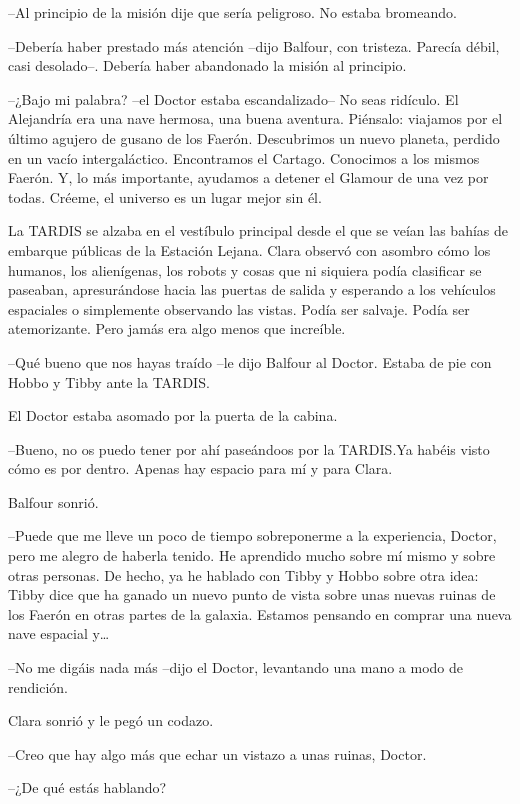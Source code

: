 {--Al principio de la misión dije que sería peligroso. No estaba
bromeando.}

{--Debería haber prestado más atención --dijo Balfour, con tristeza.
 Parecía débil, casi desolado--. Debería haber abandonado la misión al
principio.}

{--¿Bajo mi palabra? --el Doctor estaba escandalizado-- No seas ridículo.
 El Alejandría era una nave hermosa, una buena aventura. Piénsalo:
 viajamos por el último agujero de gusano de los Faerón. Descubrimos un
 nuevo planeta, perdido en un vacío intergaláctico. Encontramos el
 Cartago. Conocimos a los mismos Faerón. Y, lo más importante, ayudamos a
 detener el Glamour de una vez por todas. Créeme, el universo es un lugar
 mejor sin él.}

{La TARDIS se alzaba en el vestíbulo
 principal desde el que se veían las bahías de embarque públicas de la
 Estación Lejana. Clara observó con asombro cómo los humanos, los
 alienígenas, los robots y cosas que ni siquiera podía clasificar se
 paseaban, apresurándose hacia las puertas de salida y esperando a los
 vehículos espaciales o simplemente observando las vistas. Podía ser
 salvaje. Podía ser atemorizante. Pero jamás era algo menos que
increíble.}

{--Qué bueno que nos hayas traído --le dijo Balfour al Doctor. Estaba de
pie con Hobbo y Tibby ante la TARDIS.}

{El Doctor estaba asomado por la puerta de la cabina.}

{--Bueno, no os puedo tener por ahí paseándoos por la TARDIS.\@ Ya habéis
visto cómo es por dentro. Apenas hay espacio para mí y para Clara.}

{Balfour sonrió.}

{--Puede que me lleve un poco de tiempo sobreponerme a la experiencia,
 Doctor, pero me alegro de haberla tenido. He aprendido mucho sobre mí
 mismo y sobre otras personas. De hecho, ya he hablado con Tibby y Hobbo
 sobre otra idea: Tibby dice que ha ganado un nuevo punto de vista sobre
 unas nuevas ruinas de los Faerón en otras partes de la galaxia. Estamos
 pensando en comprar una nueva nave espacial y\ldots{}}

{--No me digáis nada más --dijo el Doctor, levantando una mano a modo de
rendición.}

{Clara sonrió y le pegó un codazo.}

{--Creo que hay algo más que echar un vistazo a unas ruinas, Doctor.}

{--¿De qué estás hablando?}

